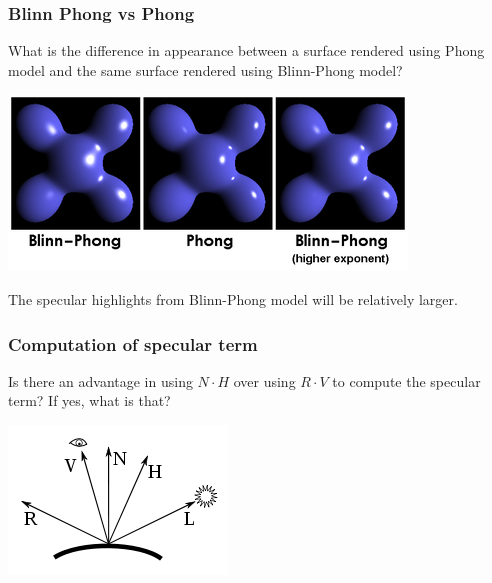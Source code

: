 \documentclass{beamer}
\begin{document}
\begin{frame}
    \frametitle{Blinn Phong vs Phong}

    What is the difference in appearance between a surface rendered using
    Phong model and the same surface rendered using Blinn-Phong model?

    \begin{center}
        \includegraphics[scale=0.4]{blinnvsphong.png}
    \end{center}

    \begin{tcolorbox}
        The specular highlights from Blinn-Phong model will be relatively larger.
    \end{tcolorbox}

\end{frame}

\begin{frame}
    \frametitle{Computation of specular term}

    Is there an advantage in using $N \cdot H$ over using $R \cdot V$ to compute the specular term? 
    If yes, what is that?

    \begin{center}
        \includegraphics[]{blinn-phong.png}
    \end{center}

\end{frame}
\end{document}
